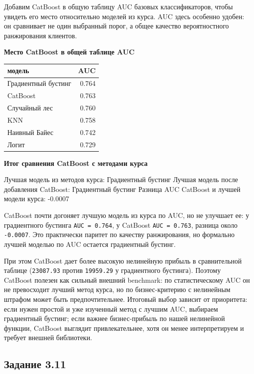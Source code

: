 \documentclass[11pt]{article}
\newcounter{none}
\begin{document}
    Добавим CatBoost в общую таблицу AUC базовых классификаторов, чтобы
увидеть его место относительно моделей из курса. AUC здесь особенно
удобен: он сравнивает не один выбранный порог, а общее качество
вероятностного ранжирования клиентов.

    \textbf{Место CatBoost в общей таблице AUC}

{\def\LTcaptype{none} %
\begin{longtable}[]{@{}lr@{}}
\toprule\noalign{}
модель & AUC \\
\midrule\noalign{}
\endhead
\bottomrule\noalign{}
\endlastfoot
Градиентный бустинг & 0.764 \\
CatBoost & 0.763 \\
Случайный лес & 0.760 \\
KNN & 0.758 \\
Наивный Байес & 0.742 \\
Логит & 0.729 \\
\end{longtable}
}

    \textbf{Итог сравнения CatBoost с методами курса}

Лучшая модель из методов курса: Градиентный бустинг Лучшая модель после
добавления CatBoost: Градиентный бустинг Разница AUC CatBoost и лучшей
модели курса: -0.0007

    CatBoost почти догоняет лучшую модель из курса по AUC, но не улучшает
ее: у градиентного бустинга \texttt{AUC\ =\ 0.764}, у CatBoost
\texttt{AUC\ =\ 0.763}, разница около \texttt{-0.0007}. Это практически
паритет по качеству ранжирования, но формально лучшей моделью по AUC
остается градиентный бустинг.

При этом CatBoost дает более высокую нелинейную прибыль в сравнительной
таблице (\texttt{23087.93} против \texttt{19959.29} у градиентного
бустинга). Поэтому CatBoost полезен как сильный внешний benchmark: по
статистическому AUC он не превосходит лучший метод курса, но по
бизнес-критерию с нелинейным штрафом может быть предпочтительнее.
Итоговый выбор зависит от приоритета: если нужен простой и уже изученный
метод с лучшим AUC, выбираем градиентный бустинг; если важнее
бизнес-прибыль по нашей нелинейной функции, CatBoost выглядит
привлекательнее, хотя он менее интерпретируем и требует внешней
библиотеки.

    \subsection{Задание
3.11}\label{ux437ux430ux434ux430ux43dux438ux435-3.11}
\end{document}
